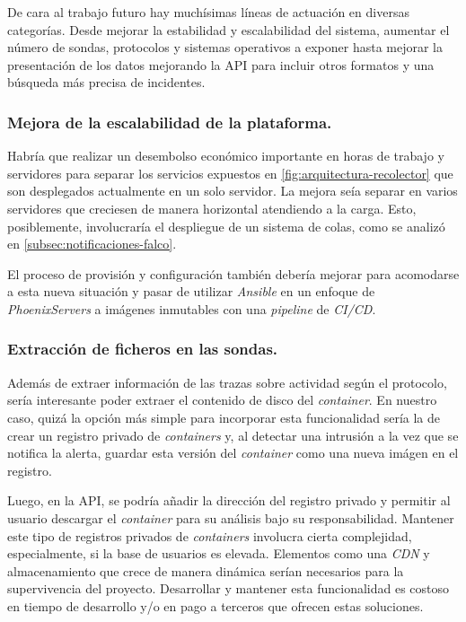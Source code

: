 De cara al trabajo futuro hay muchísimas líneas de actuación en diversas categorías. Desde mejorar la estabilidad 
y escalabilidad del sistema, aumentar el número de sondas, protocolos y sistemas operativos a exponer hasta 
mejorar la presentación de los datos mejorando la API para incluir otros formatos y una búsqueda más precisa de incidentes.

\subsubsection{Mejora de la escalabilidad de la plataforma.}

Habría que realizar un desembolso económico importante en horas de trabajo y servidores para separar los servicios expuestos
en \ref{fig:arquitectura-recolector} que son desplegados actualmente en un solo servidor. La mejora seía separar en varios servidores que creciesen
de manera horizontal atendiendo a la carga. Esto, posiblemente, involucraría el despliegue de un sistema de colas, como se analizó
en \ref{subsec:notificaciones-falco}.

El proceso de provisión y configuración también debería mejorar para acomodarse a esta nueva situación y pasar de utilizar \emph{Ansible}
en un enfoque de \emph{PhoenixServers} a imágenes inmutables con una \emph{pipeline} de \emph{CI/CD}.

\subsubsection{Extracción de ficheros en las sondas.}

Además de extraer información de las trazas sobre actividad según el protocolo, sería interesante poder extraer el contenido de disco del \emph{container}.
En nuestro caso, quizá la opción más simple para incorporar esta funcionalidad sería la de crear un registro privado de \emph{containers} y, al detectar 
una intrusión a la vez que se notifica la alerta, guardar esta versión del \emph{container} como una nueva imágen en el registro.

Luego, en la API, se podría añadir la dirección del registro privado y permitir al usuario descargar el \emph{container} para su análisis bajo su responsabilidad. 
Mantener este tipo de registros privados de \emph{containers} involucra cierta complejidad, especialmente, si la base de usuarios es elevada. Elementos como
una \emph{CDN} y almacenamiento que crece de manera dinámica serían necesarios para la supervivencia del proyecto. Desarrollar y mantener esta funcionalidad
es costoso en tiempo de desarrollo y/o en pago a terceros que ofrecen estas soluciones.

